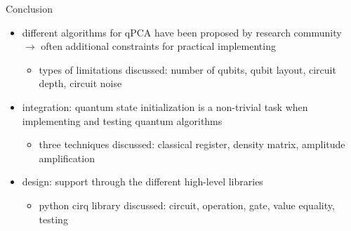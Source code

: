 \begin{frame}[title-small={color=hpiorange, bg=none, text=Conclusion}]
	\maketitle
\end{frame}


\begin{frame}{Conclusion}
  \begin{minipage}{1.0\textwidth}
    \begin{itemize}
      \item different algorithms for qPCA have been proposed by research community $\rightarrow$ often additional constraints for practical implementing
      \begin{itemize}
        \item types of limitations discussed: number of qubits, qubit layout, circuit depth, circuit noise
      \end{itemize}
      \item integration: quantum state initialization is a non-trivial task when implementing and testing quantum algorithms
      \begin{itemize}
        \item three techniques discussed: classical register, density matrix, amplitude amplification
      \end{itemize}
      \item design: support through the different high-level libraries
      \begin{itemize}
        \item python cirq library discussed: circuit, operation, gate, value equality, testing
      \end{itemize}
    \end{itemize}
  \end{minipage}
\end{frame}


